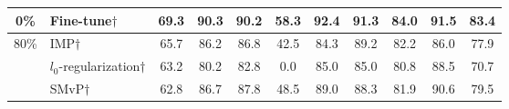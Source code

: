 \begin{table}[t]
\begin{tabular}{c|l|cccccccc|c}
		\midrule
		\multicolumn{1}{c|}{0\%}   & Fine-tune$\dagger$                                   & 69.3                                                                                   &
		90.3                                                                            & 90.2       & 58.3                                                                                    & 92.4                                                                                     & 91.3                                                                                    & 84.0                                                                                    & 91.5                                 &  83.4                                                \\
		\midrule
		\multirow{6}{*}{80\%}     &IMP$\dagger$                                                 &65.7                                                                                        &86.2                                                                               & 86.8        & 42.5                                                                                        &84.3                                                                                 &89.2                                                                                     &82.2                                                                                        &  86.0                                                    &    77.9                              \\
		&$l_0$-regularization$\dagger$                                                 & 63.2                                                                                       & 80.2                                                                                 & 82.8      &0.0                                                                                         &   85.0                                                                                       &       85.0                                                                                  &    80.8                                                                                     &  88.5                                                          &  70.7                          \\
		&SMvP$\dagger$                                                 &62.8                                                                                        &   86.7                                                                    & 87.8                 & 48.5                                                                                        &89.0                                                                                          &  88.3                                                                                       &   81.9                                                                                      &    90.6                                                                 & 79.5                  \\

\end{tabular}
\end{table}
